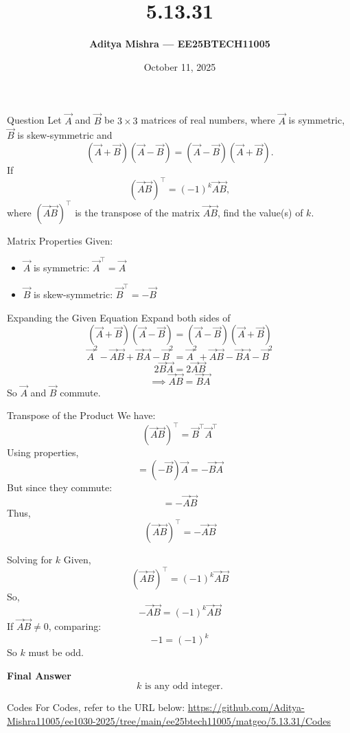 \documentclass{beamer}
\title{\textbf{5.13.31}}
\author{\textbf{Aditya Mishra — EE25BTECH11005}}
\date{October 11, 2025}
\begin{document}
\begin{frame}
\titlepage
\end{frame}

\begin{frame}{Question}
Let \(\vec{A}\) and \(\vec{B}\) be \(3 \times 3\) matrices of real numbers, where \(\vec{A}\) is symmetric, \(\vec{B}\) is skew-symmetric and 
\[
(\vec{A} + \vec{B})(\vec{A} - \vec{B}) = (\vec{A} - \vec{B})(\vec{A} + \vec{B}).
\]
If 
\[
(\vec{A}\vec{B})^\top = (-1)^k \vec{A}\vec{B},
\]
where \((\vec{A}\vec{B})^\top\) is the transpose of the matrix \(\vec{A}\vec{B}\), find the value(s) of \(k\).
\end{frame}

\begin{frame}{Matrix Properties}
Given:
\begin{itemize}
    \item \(\vec{A}\) is symmetric: \(\vec{A}^\top = \vec{A}\)
    \item \(\vec{B}\) is skew-symmetric: \(\vec{B}^\top = -\vec{B}\)
\end{itemize}
\end{frame}

\begin{frame}{Expanding the Given Equation}
Expand both sides of 
\[
(\vec{A} + \vec{B})(\vec{A} - \vec{B}) = (\vec{A} - \vec{B})(\vec{A} + \vec{B})
\]
\[
\vec{A}^2 - \vec{A}\vec{B} + \vec{B}\vec{A} - \vec{B}^2 = \vec{A}^2 + \vec{A}\vec{B} - \vec{B}\vec{A} - \vec{B}^2
\]
\[
2\vec{B}\vec{A} = 2\vec{A}\vec{B}
\]
\[
\implies \vec{A}\vec{B} = \vec{B}\vec{A}
\]
So \(\vec{A}\) and \(\vec{B}\) commute.
\end{frame}

\begin{frame}{Transpose of the Product}
We have:
\[
(\vec{A}\vec{B})^\top = \vec{B}^\top\vec{A}^\top
\]
Using properties,
\[
= (-\vec{B})\vec{A} = -\vec{B}\vec{A}
\]
But since they commute:
\[
= -\vec{A}\vec{B}
\]
Thus,
\[
(\vec{A}\vec{B})^\top = -\vec{A}\vec{B}
\]
\end{frame}

\begin{frame}{Solving for \(k\)}
Given,
\[
(\vec{A}\vec{B})^\top = (-1)^k\vec{A}\vec{B}
\]
So,
\[
- \vec{A}\vec{B} = (-1)^k \vec{A}\vec{B}
\]
If \(\vec{A}\vec{B} \neq 0\), comparing:
\[
-1 = (-1)^k
\]
So \(k\) must be odd.
\end{frame}

\begin{frame}{\textbf{Final Answer}}
\[
\boxed{
k \text{ is any odd integer}.
}
\]
\end{frame}

\begin{frame}{Codes}
\centering
For Codes, refer to the URL below:  
\url{https://github.com/Aditya-Mishra11005/ee1030-2025/tree/main/ee25btech11005/matgeo/5.13.31/Codes}
\end{frame}
\end{document}
